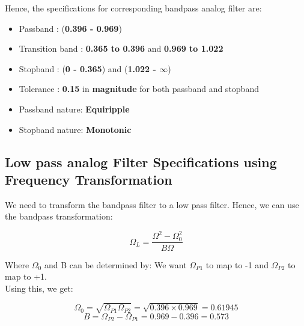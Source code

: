 \documentclass{article}
\begin{document}
Hence, the specifications for corresponding bandpass analog filter are:
\begin{itemize}
    \item Passband : (\textbf{0.396 -  0.969})
    \item  Transition band : \textbf{0.365 to 0.396} and \textbf{0.969 to 1.022}
    \item Stopband : (\textbf{0 - 0.365}) and (\textbf{1.022 - $\infty$})
    \item  Tolerance : \textbf{0.15} in \textbf{magnitude} for both passband and stopband
    \item Passband nature: \textbf{Equiripple}
    \item Stopband nature: \textbf{Monotonic}
\end{itemize}

\subsection{Low pass analog Filter Specifications using Frequency
Transformation}

We need to transform the bandpass filter to a low pass filter. Hence, we can use the bandpass transformation:
\vspace{-5mm}
\begin{center}
    \begin{equation*}
        \Omega_L = \frac{\Omega^2-\Omega_0^2}{B\Omega}
    \end{equation*}
\end{center}

Where $\Omega_0$ and B can be determined by:
We want $\Omega_{P1}$ to map to -1 and $\Omega_{P2}$ to map to +1.\\
Using this, we get:
\begin{center}
    \begin{equation*}
        \Omega_0 = \sqrt{\Omega_{P1}\Omega_{P2}} = \sqrt{0.396 \times 0.969} = 0.61945
    \end{equation*}
    \begin{equation*}
        B = \Omega_{P2} - \Omega_{P1} = 0.969 - 0.396 = 0.573
    \end{equation*}
\end{center}
\end{document}
